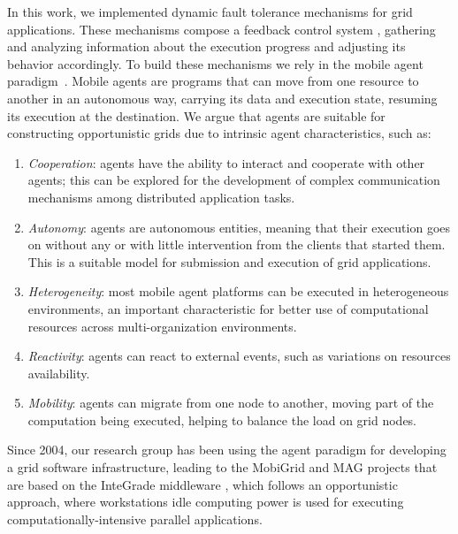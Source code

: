 \documentclass[times, 09pt, twocolumn]{article}
\begin{document}
In this work, we implemented dynamic fault tolerance mechanisms for grid
applications. These mechanisms compose a feedback control system
\cite{steere99, goel99}, gathering and analyzing information about the execution
progress and adjusting its behavior accordingly. To build these mechanisms we
rely in the mobile agent paradigm~\cite{pham98}. Mobile agents are programs that can move
from one resource to another in an autonomous way, carrying its data and
execution state, resuming its execution at the destination. We argue that
agents are suitable for constructing opportunistic grids due to intrinsic agent characteristics, 
such as:

\begin{enumerate}
    \item \emph{Cooperation}: agents have the ability to interact and cooperate
    with other agents; this can be explored for the development of complex
    communication mechanisms among distributed application tasks.
   
    \item \emph{Autonomy}: agents are autonomous entities, meaning that their
    execution goes on without any or with little intervention from the clients
    that started them. This is a suitable model for submission and execution
    of grid applications.
  
    \item \emph{Heterogeneity}: most mobile agent platforms can be executed
    in heterogeneous environments, an important characteristic for better use
    of computational resources across multi-organization environments.
  
    \item \emph{Reactivity}: agents can react to external events, such as
    variations on resources availability.
  
    \item \emph{Mobility}: agents can migrate from one node to another,
    moving part of the computation being executed, helping to balance the load on grid nodes.
\end{enumerate}

Since 2004, our research group has been using the agent paradigm
for developing a grid software infrastructure, leading to the MobiGrid \cite{barbosa04} and MAG \cite{lopes05}
projects  that are based on the
InteGrade middleware \cite{goldchleger04}, which follows an opportunistic approach, where
workstations idle computing power is used for executing
computationally-intensive parallel applications.
\end{document}
